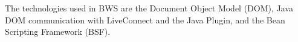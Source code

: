The technologies used in BWS are the Document Object Model (DOM), Java DOM communication with LiveConnect and the Java Plugin, and the Bean Scripting Framework (BSF).